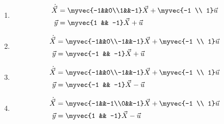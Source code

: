 \begin{multicols}{2}
\begin{enumerate}
	\item \begin{align*}\dot{\vec{X}}&= \myvec{-1&&0\\1&&-1} \vec{X} + \myvec{-1 \\ 1} \vec{u} \\ \vec{y}&=\myvec{1 && -1}\vec{X} + \vec{u}\end{align*}
    \item \begin{align*}\dot{\vec{X}}&= \myvec{-1&&0\\-1&&-1} \vec{X} + \myvec{-1 \\ 1} \vec{u} \\ \vec{y}&=\myvec{-1 && -1}\vec{X} + \vec{u}\end{align*}  
    \item \begin{align*}\dot{\vec{X}}&= \myvec{-1&&0\\-1&&-1} \vec{X} + \myvec{-1 \\ 1} \vec{u} \\ \vec{y}&=\myvec{-1 && -1}\vec{X} - \vec{u}\end{align*}
    \item \begin{align*}\dot{\vec{X}}&= \myvec{-1&&-1\\0&&-1} \vec{X} + \myvec{-1 \\ 1} \vec{u} \\ \vec{y}&=\myvec{1 && -1}\vec{X} - \vec{u}\end{align*}
\end{enumerate}
\end{multicols}

